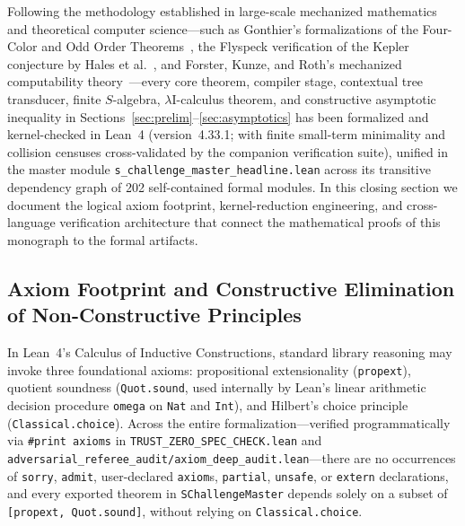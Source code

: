 \documentclass[11pt,reqno]{amsart}
\numberwithin{equation}{section}
\theoremstyle{plain}
\theoremstyle{definition}
\theoremstyle{remark}
\begin{document}
Following the methodology established in large-scale mechanized mathematics and theoretical computer science---such as Gonthier's formalizations of the Four-Color and Odd Order Theorems~\cite{Gonthier2008FourColor,Gonthier2013OddOrder}, the Flyspeck verification of the Kepler conjecture by Hales et al.~\cite{Hales2017Kepler}, and Forster, Kunze, and Roth's mechanized computability theory~\cite{ForsterKunzeRoth2020}---every core theorem, compiler stage, contextual tree transducer, finite $S$-algebra, $\lambda\mathrm{I}$-calculus theorem, and constructive asymptotic inequality in Sections~\ref{sec:prelim}--\ref{sec:asymptotics} has been formalized and kernel-checked in Lean~4 (version~4.33.1; with finite small-term minimality and collision censuses cross-validated by the companion verification suite), unified in the master module \texttt{s\_challenge\_master\_headline.lean} across its transitive dependency graph of 202 self-contained formal modules. In this closing section we document the logical axiom footprint, kernel-reduction engineering, and cross-language verification architecture that connect the mathematical proofs of this monograph to the formal artifacts.

\subsection{Axiom Footprint and Constructive Elimination of Non-Constructive Principles}
\label{subsec:axiom-footprint}

In Lean~4's Calculus of Inductive Constructions, standard library reasoning may invoke three foundational axioms: propositional extensionality (\texttt{propext}), quotient soundness (\texttt{Quot.sound}, used internally by Lean's linear arithmetic decision procedure \texttt{omega} on \texttt{Nat} and \texttt{Int}), and Hilbert's choice principle (\texttt{Classical.choice}). Across the entire formalization---verified programmatically via \texttt{\#print axioms} in \texttt{TRUST\_ZERO\_SPEC\_CHECK.lean} and \texttt{adversarial\_referee\_audit/axiom\_deep\_audit.lean}---there are no occurrences of \texttt{sorry}, \texttt{admit}, user-declared \texttt{axiom}s, \texttt{partial}, \texttt{unsafe}, or \texttt{extern} declarations, and every exported theorem in \texttt{SChallengeMaster} depends solely on a subset of \texttt{[propext, Quot.sound]}, without relying on \texttt{Classical.choice}.
\end{document}
